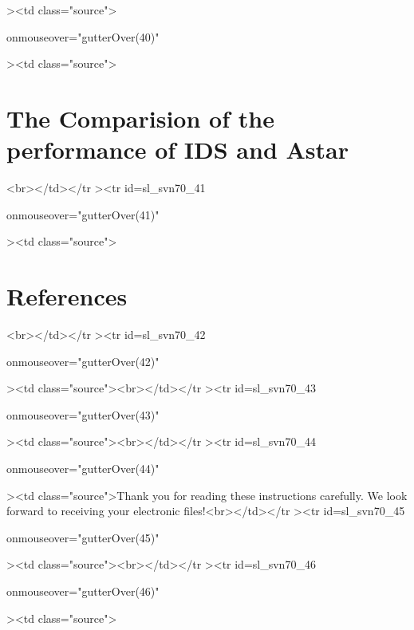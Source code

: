 ><td class="source">\documentclass[letterpaper]{article}<br></td></tr
\begin{document}
 onmouseover="gutterOver(40)"

><td class="source">\section{The Comparision of the performance of IDS and Astar}<br></td></tr
><tr
id=sl_svn70_41

 onmouseover="gutterOver(41)"

><td class="source">\section{ References}<br></td></tr
><tr
id=sl_svn70_42

 onmouseover="gutterOver(42)"

><td class="source"><br></td></tr
><tr
id=sl_svn70_43

 onmouseover="gutterOver(43)"

><td class="source">\bigskip<br></td></tr
><tr
id=sl_svn70_44

 onmouseover="gutterOver(44)"

><td class="source">\noindent Thank you for reading these instructions carefully. We look forward to receiving your electronic files!<br></td></tr
><tr
id=sl_svn70_45

 onmouseover="gutterOver(45)"

><td class="source"><br></td></tr
><tr
id=sl_svn70_46

 onmouseover="gutterOver(46)"

><td class="source">
\end{document}
